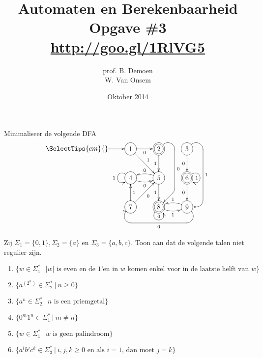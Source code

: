 \documentclass[a4paper]{article}
\title{Automaten en Berekenbaarheid\\Opgave \#3\\\url{http://goo.gl/1RlVG5}}
\author{prof. B. Demoen\\W. Van Onsem}
\date{Oktober 2014}
\begin{document}
\maketitle

\begin{question}
Minimaliseer de volgende DFA \\
\[  \entrymodifiers={++[o][F-]}
  \SelectTips{cm}{}
  \xymatrix {
    *{} \ar[r] &
    1               \ar[r]_0    \ar[rd]^1                              &
    *++[o][F=]{2}   \ar[d]_1    \ar `ur_r[dd]  `[dd] `_dl[dd]^0 [dd]     &
    3               \ar `ur_d[dd] `_l[dd]^1 [dd]   \ar[d]_0                               \\
    *{} &
    4               \ar@(lu,ld)[]_1   \ar@/_/[r]_0      &
    5               \ar[d]_1          \ar@/_/[l]_0      &
    *++[o][F=]{6}   \ar@(ru,rd)[]_1   \ar[d]_0          \\
    *{} &
    7               \ar[u]_1          \ar[ru]_0                     &
    *++[o][F=]{8}   \ar@(ld,rd)[]^0   \ar@/_/[r]_1                  &
    9                \ar@/_/[l]_1      \ar `dr_l[ll] `_ur[ll]^0 [ll]  \\
} \]
\end{question}

\begin{question}
Zij $\Sigma_1 = \{0,1\}, \Sigma_2 = \{a\}$ en $\Sigma_3 = \{a,b,c\}$. Toon aan dat de volgende talen niet regulier zijn.
\begin{enumerate}
  \item $\{ w \in \Sigma_1^*\ |\ \mbox{$\left|w\right|$ is even en de $1$'en in $w$ komen enkel voor in de laatste helft van $w$}\}$   %
  \item $\{ a^{\left( 2^n \right) } \in \Sigma_2^* \ | \ n \geq 0 \}$                                      %
  \item $\{ a^n \in \Sigma_2^*\ | \ \mbox{$n$ is een priemgetal} \}$                                       %
  \item $\{ 0^m1^n \in \Sigma_1^* \ | \ m \neq n \}$                                                       %
  \item $\{ w \in \Sigma_1^* \ | \ \mbox{$w$ is geen palindroom} \}$                                       %
  \item $\{ a^ib^jc^k \in \Sigma_3^* \ | \ \mbox{$i,j,k \geq 0$ en als $i = 1$, dan moet $j=k$} \}$        %
\end{enumerate}
\end{question}
\end{document}
